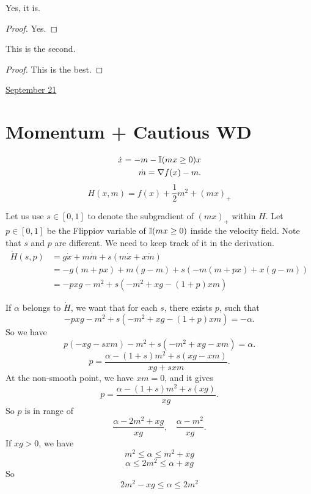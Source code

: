 \documentclass[letterpaper,11pt]{article}
\begin{document}
\begin{thm}
    Yes, it is. 
\end{thm}
\begin{proof} 
    Yes. 
\end{proof}    

\begin{theorem}
    This is the second. 
\end{theorem}
\begin{proof}
    This is the best. 
\end{proof}     





\clearpage


\href{run:2025-09-21-momentum_cwd.tex}{\Huge September 21} 

\section{Momentum + Cautious WD}

\begin{align}
    \dot x = - m - \mathbb{I}(mx\geq 0) x \\ 
    \dot m = \nabla f(x) - m. 
\end{align}
$$
H(x, m) = f(x) + \frac{1}{2} m^2 + (mx)_+
$$

Let us use $s \in[0,1]$ to denote the subgradient of $(mx)_+$ within $H$. Let $p \in[0,1]$ be the Flippiov variable of $\mathbb{I}(mx \geq 0)$ inside the velocity field. Note that $s$ and $p$ are different. We need to keep track of it in the derivation. 
\begin{align*}
\dot H(s,p) &  =  g \dot x + m \dot m + s (m \dot x + x \dot m) \\ 
& = -g (m + p x) + m(g - m) + s (-m (m + p x) + x (g - m) )\\
& = - p x g - m^2 + s (- m^2 + xg - (1+p)xm)
\end{align*}

If $\alpha$ belongs to $\dot H$, we want that for each $s$, there exists $p$, such that 
$$
- p x g - m^2 + s (- m^2 + xg - (1+p)xm) = -\alpha.
$$
So we have 
$$
p (-xg - s x m ) - m^2 + s (-m^2 + xg - xm) = \alpha. 
$$
$$
p = \frac{\alpha -(1+s) m^2 + s (xg - xm)}{xg +  s xm}. 
$$
At the non-smooth point, we have $xm =0$, and it gives 
$$
p = \frac{\alpha -(1+s) m^2 + s (xg)}{xg}.  
$$
So $p$ is in range of 
$$
\frac{\alpha - 2m^2 + xg}{xg}, ~~~~ 
\frac{\alpha - m^2 }{xg}. 
$$
If $xg >0$, we have 
$$
m^2 \leq \alpha \leq m^2 + xg
$$
$$
\alpha \leq 2m^2 \leq \alpha + xg 
$$
So 
$$
2m^2  - xg \leq \alpha \leq 2 m^2
$$
\end{document}
